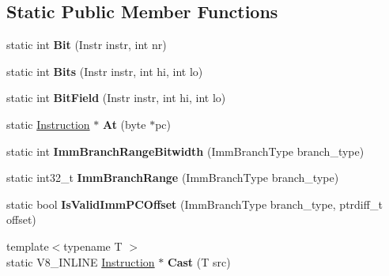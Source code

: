 \subsection*{Static Public Member Functions}
\begin{DoxyCompactItemize}
\item 
static int {\bfseries Bit} (Instr instr, int nr)\hypertarget{classv8_1_1internal_1_1_instruction_a72f9d7a469c17eea228fe628530157e4}{}\label{classv8_1_1internal_1_1_instruction_a72f9d7a469c17eea228fe628530157e4}

\item 
static int {\bfseries Bits} (Instr instr, int hi, int lo)\hypertarget{classv8_1_1internal_1_1_instruction_af5577086b166e1c6f418c077ab935a9c}{}\label{classv8_1_1internal_1_1_instruction_af5577086b166e1c6f418c077ab935a9c}

\item 
static int {\bfseries Bit\+Field} (Instr instr, int hi, int lo)\hypertarget{classv8_1_1internal_1_1_instruction_a0f8fff80fb9aeeeb77172229c7d73d26}{}\label{classv8_1_1internal_1_1_instruction_a0f8fff80fb9aeeeb77172229c7d73d26}

\item 
static \hyperlink{classv8_1_1internal_1_1_instruction}{Instruction} $\ast$ {\bfseries At} (byte $\ast$pc)\hypertarget{classv8_1_1internal_1_1_instruction_ababb29269d211ebdc2c9c772e06dc85e}{}\label{classv8_1_1internal_1_1_instruction_ababb29269d211ebdc2c9c772e06dc85e}

\item 
static int {\bfseries Imm\+Branch\+Range\+Bitwidth} (Imm\+Branch\+Type branch\+\_\+type)\hypertarget{classv8_1_1internal_1_1_instruction_aceacb23d0cb19bfa603b1e8dec505aaa}{}\label{classv8_1_1internal_1_1_instruction_aceacb23d0cb19bfa603b1e8dec505aaa}

\item 
static int32\+\_\+t {\bfseries Imm\+Branch\+Range} (Imm\+Branch\+Type branch\+\_\+type)\hypertarget{classv8_1_1internal_1_1_instruction_a7b095e92ba5b03354df8314085bd6f62}{}\label{classv8_1_1internal_1_1_instruction_a7b095e92ba5b03354df8314085bd6f62}

\item 
static bool {\bfseries Is\+Valid\+Imm\+P\+C\+Offset} (Imm\+Branch\+Type branch\+\_\+type, ptrdiff\+\_\+t offset)\hypertarget{classv8_1_1internal_1_1_instruction_a584e16e6e6c7f84789ae310842a51f8a}{}\label{classv8_1_1internal_1_1_instruction_a584e16e6e6c7f84789ae310842a51f8a}

\item 
{\footnotesize template$<$typename T $>$ }\\static V8\+\_\+\+I\+N\+L\+I\+NE \hyperlink{classv8_1_1internal_1_1_instruction}{Instruction} $\ast$ {\bfseries Cast} (T src)\hypertarget{classv8_1_1internal_1_1_instruction_aecb7a04edf284a6cbebb48c86792fdfd}{}\label{classv8_1_1internal_1_1_instruction_aecb7a04edf284a6cbebb48c86792fdfd}


\end{DoxyCompactItemize}
